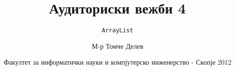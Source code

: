 

\author[АВ4]{М-р Томче Делев}
\title[Напредно програмирање]{Аудиториски вежби 4}
\subtitle{\texttt{ArrayList}}
\date{Факултет за информатички науки и компјутерско инженерство - Скопје 2012}





\frame[t,plain]{\titlepage}

%








